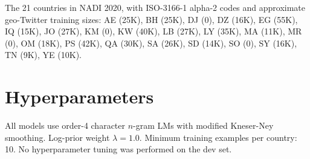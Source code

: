 \documentclass[11pt]{article}
\begin{document}
The 21 countries in NADI 2020, with ISO-3166-1 alpha-2 codes and approximate
geo-Twitter training sizes: AE (25K), BH (25K), DJ (0), DZ (16K), EG (55K),
IQ (15K), JO (27K), KM (0), KW (40K), LB (27K), LY (35K), MA (11K), MR (0),
OM (18K), PS (42K), QA (30K), SA (26K), SD (14K), SO (0), SY (16K), TN (9K),
YE (10K).

\section{Hyperparameters}
\label{app:hyperparams}

All models use order-4 character $n$-gram LMs with modified Kneser-Ney smoothing.
Log-prior weight $\lambda=1.0$. Minimum training examples per country: 10.
No hyperparameter tuning was performed on the dev set.
\end{document}
